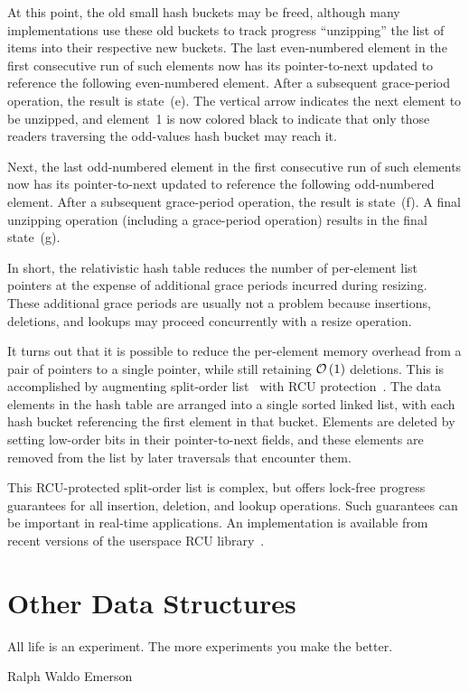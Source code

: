 At this point, the old small hash buckets may be freed, although many
implementations use these old buckets to track progress ``unzipping''
the list of items into their respective new buckets.
The last even-numbered element in the first consecutive run of such
elements now has its pointer-to-next updated to reference the following
even-numbered element.
After a subsequent grace-period operation, the result is state~(e).
The vertical arrow indicates the next element to be unzipped, and
element~1 is now colored black to indicate that only those readers traversing
the odd-values hash bucket may reach it.

Next, the last odd-numbered element in the first consecutive run of such
elements now has its pointer-to-next updated to reference the following
odd-numbered element.
After a subsequent grace-period operation, the result is state~(f).
A final unzipping operation (including a grace-period operation)
results in the final state~(g).

In short, the relativistic hash table reduces the number of per-element
list pointers at the expense of additional grace periods incurred during
resizing.
These additional grace periods are usually not a problem because
insertions, deletions, and lookups may proceed concurrently with
a resize operation.

It turns out that it is possible to reduce the per-element memory overhead
from a pair of pointers to a single pointer, while still retaining
$\mathcal{O}\left(1\right)$ deletions.
This is accomplished by augmenting split-order
list~\cite{OriShalev2006SplitOrderListHash}
with RCU
protection~\cite{MathieuDesnoyers2009URCU,PaulMcKenney2013LWNURCUhash}.
The data elements in the hash table are arranged into a single
sorted linked list, with each hash bucket referencing the first element
in that bucket.
Elements are deleted by setting low-order bits in their pointer-to-next
fields, and these elements are removed from the list by later traversals
that encounter them.

This RCU-protected split-order list is complex, but offers lock-free
progress guarantees for all insertion, deletion, and lookup operations.
Such guarantees can be important in real-time applications.
An implementation is available from recent versions of the userspace RCU
library~\cite{MathieuDesnoyers2009URCU}.

\section{Other Data Structures}
\label{sec:datastruct:Other Data Structures}
%
\epigraph{All life is an experiment.
	  The more experiments you make the better.}
	 {Ralph Waldo Emerson}

